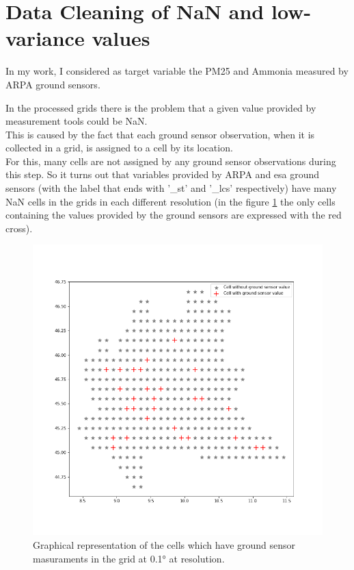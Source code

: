 \section{Data Cleaning of NaN and low-variance values }
\label{subsec:nan}
In my work, I considered as target variable the PM25 and Ammonia measured by ARPA ground sensors.\\

\newline
In the processed grids there is the problem that a given value provided by measurement tools could be NaN. \\
This is caused by the fact that each ground sensor observation, when it is collected in a grid, is assigned to a cell by its location. \\
For this, many cells are not assigned by any ground sensor observations during this step.
So it turns out that variables provided by ARPA and \acrshort{esa} ground sensors (with the label that ends with '\_st' and '\_lcs' respectively) have many NaN cells in the grids in each different resolution (in the figure \ref{fig:knn-interpolated} the only cells containing the values provided by the ground sensors are expressed with the red cross).
\begin{figure}[H] 
\centering
\includegraphics[scale=0.4]{images/cell_with_sensors.png}
  \caption{Graphical representation of the cells which have ground sensor masuraments in the grid at 0.1° at resolution.}
 \label{fig:knn-interpolated}
\end{figure}
